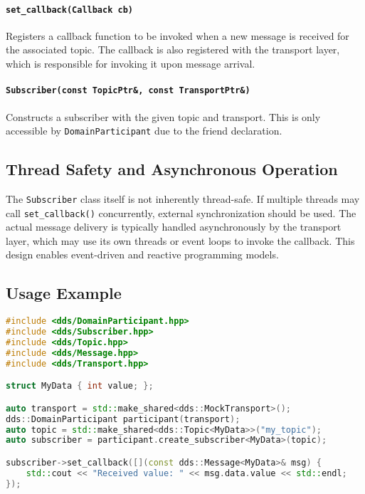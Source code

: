 \documentclass[12pt]{report}
\begin{document}
\paragraph{\texttt{set\_callback(Callback cb)}}
Registers a callback function to be invoked when a new message is received for the associated topic. The callback is also registered with the transport layer, which is responsible for invoking it upon message arrival.

\paragraph{\texttt{Subscriber(const TopicPtr\&, const TransportPtr\&)}}
Constructs a subscriber with the given topic and transport. This is only accessible by \texttt{DomainParticipant} due to the friend declaration.

\subsection{Thread Safety and Asynchronous Operation}
The \texttt{Subscriber} class itself is not inherently thread-safe. If multiple threads may call \texttt{set\_callback()} concurrently, external synchronization should be used. The actual message delivery is typically handled asynchronously by the transport layer, which may use its own threads or event loops to invoke the callback. This design enables event-driven and reactive programming models.

\subsection{Usage Example}
\begin{lstlisting}[language=C++]
#include <dds/DomainParticipant.hpp>
#include <dds/Subscriber.hpp>
#include <dds/Topic.hpp>
#include <dds/Message.hpp>
#include <dds/Transport.hpp>

struct MyData { int value; };

auto transport = std::make_shared<dds::MockTransport>();
dds::DomainParticipant participant(transport);
auto topic = std::make_shared<dds::Topic<MyData>>("my_topic");
auto subscriber = participant.create_subscriber<MyData>(topic);

subscriber->set_callback([](const dds::Message<MyData>& msg) {
    std::cout << "Received value: " << msg.data.value << std::endl;
});
\end{lstlisting}
\end{document}
